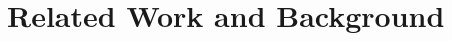 \documentclass[10pt,twocolumn,letterpaper]{article}
\newcommand{\method}{R\textsc{e}V\textsc{ea}L\xspace}
\begin{document}
\begin{comment}
In this paper, we propose a novel end-to-end training framework for Retrieval-Augmented Visual Language Model (\method). We made several modification to the standard Fusion-In-Decoder (FID) architecture to better adapt vision language modelling: 1) compress the retrieved knowledge via Perceiver into a more condensed embedding list; 2) instead of concatenating question with knowledge, we propose a two-stage retrieval pipeline, adding a Transformer-like re-ranking module to jointly model the interaction between all retrieved knowledge and question. To support end-to-end training of knowledge retriever module, we model the retrieval scores as latent variables and multiply them with token embedding of each retrieved knowledge in re-ranking module.
In this way, the knowledge retriever could be back-propagated to learn similar retrieval scores closer to more accurate re-ranking score, similar as conducting soft distillation in a differentiable manner. 


Experiments Part



This key contributions are as follows:
\begin{compactitem}
\item 
We propose \method to conduct end-to-end retrieval augmented visual language model training. 
\item We propose a unified online memory representation encoding a wide range of knowledge sources, and show that for different queries the model could learn to retrieve different kinds of knowledges though retrieval learning.
\item We pre-train \method on large-scale image caption datasets, and the learned model achieve SOTA performance on several knowledge-intensive tasks, including OK-VQA, A-OKVQA, etc.
\end{compactitem}








\end{comment} \section{Related Work and Background}\label{sec:related}
\end{document}
